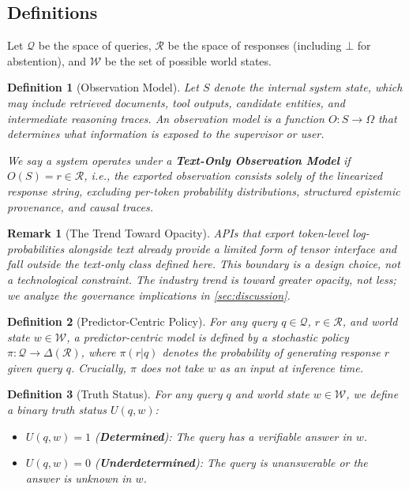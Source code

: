 \documentclass[11pt]{article}
\newcommand{\R}{\mathcal{R}}
\newcommand{\Q}{\mathcal{Q}}
\newcommand{\W}{\mathcal{W}}
\newtheorem{definition}{Definition}
\newtheorem{remark}{Remark}
\begin{document}
\subsection{Definitions}

Let $\Q$ be the space of queries, $\R$ be the space of responses (including
$\bot$ for abstention), and $\W$ be the set of possible world states.

\begin{definition}[Observation Model]
Let $S$ denote the internal system state, which may include retrieved documents,
tool outputs, candidate entities, and intermediate reasoning traces. An
observation model is a function $O : S \rightarrow \Omega$ that determines what
information is exposed to the supervisor or user.

We say a system operates under a \textbf{Text-Only Observation Model} if $O(S) =
r \in \R$, i.e., the exported observation consists solely of the linearized
response string, excluding per-token probability distributions, structured
epistemic provenance, and causal traces.
\end{definition}

\begin{remark}[The Trend Toward Opacity]
APIs that export token-level log-probabilities alongside text already provide
a limited form of tensor interface and fall outside the text-only class defined
here. This boundary is a design choice, not a technological constraint. The industry trend is toward \emph{greater} opacity, not less; we analyze the governance implications in \autoref{sec:discussion}.
\end{remark}

\begin{definition}[Predictor-Centric Policy]
For any query $q \in \Q$, $r \in \R$, and world state $w \in \W$, a
predictor-centric model is defined by a stochastic policy $\pi: \Q \to
\Delta(\R)$, where $\pi(r|q)$ denotes the probability of generating response $r$
given query $q$. Crucially, $\pi$ does not take $w$ as an input at inference
time.
\end{definition}

\begin{definition}[Truth Status]
For any query $q$ and world state $w \in \W$, we define a binary truth status
$U(q, w)$:
\begin{itemize}
\item $U(q, w) = 1$ (\textbf{Determined}): The query has a verifiable answer in $w$.
\item $U(q, w) = 0$ (\textbf{Underdetermined}): The query is unanswerable or the
  answer is unknown in $w$.
\end{itemize}
\end{definition}
\end{document}
